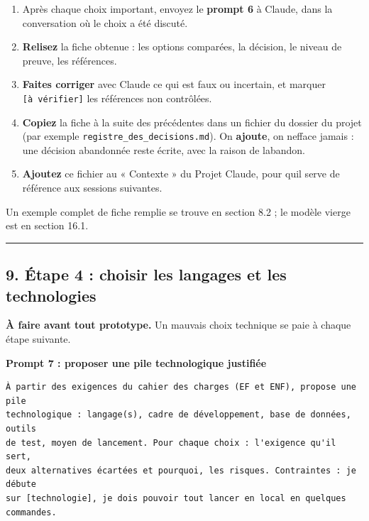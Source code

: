 \documentclass[
  french,
  11pt,
  a4paper,
]{article}
\providecommand{\tightlist}{%
  \setlength{\itemsep}{0pt}\setlength{\parskip}{0pt}}
\begin{document}
\begin{enumerate}
\def\labelenumi{\arabic{enumi}.}
\tightlist
\item
  Après chaque choix important, envoyez le \textbf{prompt 6} à Claude,
  dans la conversation où le choix a été discuté.
\item
  \textbf{Relisez} la fiche obtenue : les options comparées, la
  décision, le niveau de preuve, les références.
\item
  \textbf{Faites corriger} avec Claude ce qui est faux ou incertain, et
  marquer \texttt{{[}à\ vérifier{]}} les références non contrôlées.
\item
  \textbf{Copiez} la fiche à la suite des précédentes dans un fichier du
  dossier du projet (par exemple
  \texttt{registre\_\allowbreak{}des\_\allowbreak{}decisions.\allowbreak{}md}).
  On \textbf{ajoute}, on n\textquotesingle efface jamais : une décision
  abandonnée reste écrite, avec la raison de l\textquotesingle abandon.
\item
  \textbf{Ajoutez} ce fichier au « Contexte » du Projet Claude, pour
  qu\textquotesingle il serve de référence aux sessions suivantes.
\end{enumerate}

Un exemple complet de fiche remplie se trouve en section 8.2 ; le modèle
vierge est en section 16.1.

\begin{center}\rule{0.5\linewidth}{0.5pt}\end{center}

\subsection{9. Étape 4 : choisir les langages et les
technologies}\label{9-uxe9tape-4--choisir-les-langages-et-les-technologies}

\textbf{À faire avant tout prototype.} Un mauvais choix technique se
paie à chaque étape suivante.

\textbf{Prompt 7 : proposer une pile technologique justifiée}

\begin{Verbatim}[breaklines=true,breakanywhere=true,fontsize=\small,frame=leftline,framerule=1.6pt,rulecolor=\color{credixblue},framesep=3mm,xleftmargin=2mm,xrightmargin=1mm]
À partir des exigences du cahier des charges (EF et ENF), propose une pile
technologique : langage(s), cadre de développement, base de données, outils
de test, moyen de lancement. Pour chaque choix : l'exigence qu'il sert,
deux alternatives écartées et pourquoi, les risques. Contraintes : je débute
sur [technologie], je dois pouvoir tout lancer en local en quelques commandes.
\end{Verbatim}
\end{document}
